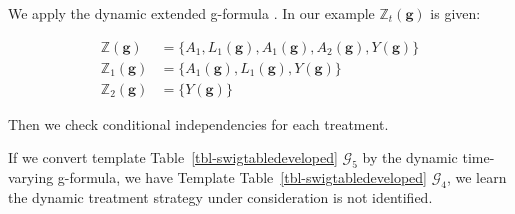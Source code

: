 \documentclass[
  single column]{article}
\begin{document}
We apply the dynamic extended g-formula . In our example
\(\mathbb{Z}_t(\mathbf{g})\) is given:

\[
\begin{aligned}
\mathbb{Z}(\mathbf{g}) &= \{A_1, L_1(\mathbf{g}), A_1(\mathbf{g}), A_2(\mathbf{g}), Y(\mathbf{g})\} \\
\mathbb{Z}_1(\mathbf{g}) &= \{A_1(\mathbf{g}), L_1(\mathbf{g}), Y(\mathbf{g})\} \\
\mathbb{Z}_2(\mathbf{g}) &= \{Y(\mathbf{g})\}
\end{aligned}
\]

Then we check conditional independencies for each treatment.

If we convert template Table~\ref{tbl-swigtabledeveloped}
\(\mathcal{G}_5\) by the dynamic time-varying g-formula, we have
Template Table~\ref{tbl-swigtabledeveloped} \(\mathcal{G}_4\), we learn
the dynamic treatment strategy under consideration is not identified.
\end{document}
